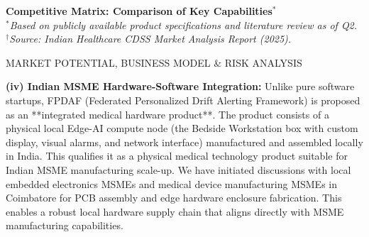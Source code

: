 \documentclass[11pt, a4paper]{article}
\begin{document}
\vspace{0.2cm}
\textbf{Competitive Matrix: Comparison of Key Capabilities$^*$}\\
\vspace{0.1cm}
\noindent
{}
\vspace{0.1cm}
\textit{\small $^*$Based on publicly available product specifications and literature review as of Q2.}\\
\textit{\small $^\dagger$Source: Indian Healthcare CDSS Market Analysis Report (2025).}

\vspace{0.6cm}

{\Large\color{sectionBlue} MARKET POTENTIAL, BUSINESS MODEL \& RISK ANALYSIS}
\vspace{0.2cm}

\textbf{(iv) Indian MSME Hardware-Software Integration:}
Unlike pure software startups, FPDAF (Federated Personalized Drift Alerting Framework) is proposed as an **integrated medical hardware product**. The product consists of a physical local Edge-AI compute node (the Bedside Workstation box with custom display, visual alarms, and network interface) manufactured and assembled locally in India. This qualifies it as a physical medical technology product suitable for Indian MSME manufacturing scale-up. We have initiated discussions with local embedded electronics MSMEs and medical device manufacturing MSMEs in Coimbatore for PCB assembly and edge hardware enclosure fabrication. This enables a robust local hardware supply chain that aligns directly with MSME manufacturing capabilities.
\end{document}
